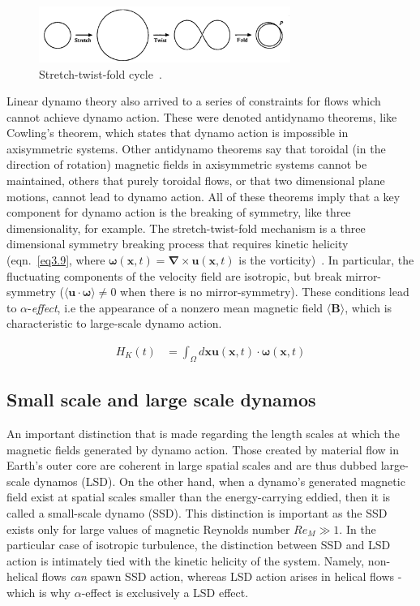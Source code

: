 \documentclass[12pt,a4paper]{report}
\begin{document}
\begin{figure}[!ht]
\centering
\includegraphics[width=0.73\textwidth]{img/STF}
\caption{Stretch-twist-fold cycle~\cite{moffatt1985topological}.}
\label{fig3.2}
\end{figure}

Linear dynamo theory also arrived to a series of constraints for flows which cannot achieve dynamo action. These were denoted antidynamo theorems, like Cowling's theorem, which states that dynamo action is impossible in axisymmetric systems. Other antidynamo theorems say that toroidal (in the direction of rotation) magnetic fields in axisymmetric systems cannot be maintained, others that purely toroidal flows, or that two dimensional plane motions, cannot lead to dynamo action. All of these theorems imply that a key component for dynamo action is the breaking of symmetry, like three dimensionality, for example. The stretch-twist-fold mechanism is a three dimensional symmetry breaking process that requires kinetic helicity (eqn.~\ref{eq3.9}, where $ \bm \omega(\bm x, t) = \bm \nabla \times \bm u(\bm x, t)$ is the vorticity)~\cite{LinkmannMoritzFrederikLeon2016Spim}. In particular, the fluctuating components of the velocity field are isotropic, but break mirror-symmetry ($\langle \bm u \cdot \bm \omega \rangle \neq 0$ when there is no mirror-symmetry). These conditions lead to $\alpha$-\textit{effect}, i.e the appearance of a nonzero mean magnetic field $\langle \bm B \rangle$, which is characteristic to large-scale dynamo action.

\begin{align}
 H_K(t) &= \int_\Omega d \bm x \bm u(\bm x, t) \cdot \bm \omega(\bm x, t) \label{eq3.9}
\end{align}

\subsection{Small scale and large scale dynamos}

An important distinction that is made regarding the length scales at which the magnetic fields generated by dynamo action. Those created by material flow in Earth's outer core are coherent in large spatial scales and are thus dubbed large-scale dynamos (LSD). On the other hand, when a dynamo's generated magnetic field exist at spatial scales smaller than the energy-carrying eddied, then it is called a small-scale dynamo (SSD). This distinction is important as the SSD exists only for large values of magnetic Reynolds number $Re_M \gg 1$. In the particular case of isotropic turbulence, the distinction between SSD and LSD action is intimately tied with the kinetic helicity of the system. Namely, non-helical flows \textit{can} spawn SSD action, whereas LSD action arises in helical flows - which is why $\alpha$-effect is exclusively a LSD effect.
\end{document}
